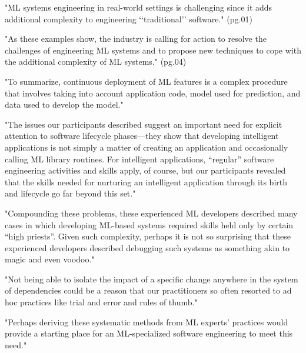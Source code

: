 "ML systems engineering in real-world settings is challenging
since it adds additional complexity to engineering ‘‘traditional’’
software." (pg.01)

"As these examples show, the industry is calling for action to resolve
the challenges of engineering ML systems and to propose new techniques
to cope with the additional complexity of ML systems." (pg.04)


\parencite{Granlund2021MLOpsCases}

"To summarize, continuous deployment of ML features is a complex procedure
that involves taking into account application code, model used for prediction,
and data used to develop the model."


\parencite{Hilllaz2016TrialsStudy}

"The issues our participants described suggest an important need for explicit
attention to software lifecycle phases—they show that developing intelligent
applications is not simply a matter of creating an application and occasionally
calling ML library routines. For intelligent applications, “regular” software
engineering activities and skills apply, of course, but our participants
revealed that the skills needed for nurturing an intelligent application through
its birth and lifecycle go far beyond this set."

"Compounding these problems, these experienced ML developers described many
cases in which developing ML-based systems required skills held only by certain
“high priests”. Given such complexity, perhaps it is not so surprising that
these experienced developers described debugging such systems as something akin
to magic and even voodoo."

"Not being able to isolate the impact of a specific change anywhere in the
system of dependencies could be a reason that our practitioners so often
resorted to ad hoc practices like trial and error and rules of thumb."

"Perhaps deriving these systematic methods from ML experts' practices would
provide a starting place for an ML-specialized software engineering to meet
this need."

